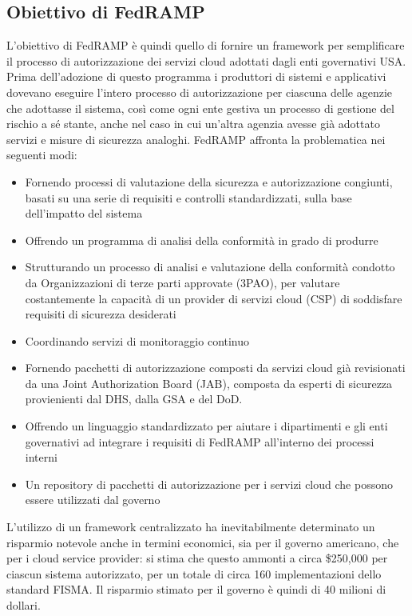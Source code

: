\documentclass[../main.tex]{subfiles}
\begin{document}
\subsection{Obiettivo di FedRAMP}
L'obiettivo di FedRAMP è quindi quello di fornire un framework per semplificare il processo di autorizzazione dei servizi cloud adottati dagli enti governativi USA.
Prima dell'adozione di questo programma i produttori di sistemi e applicativi dovevano eseguire l'intero processo di autorizzazione per ciascuna delle agenzie che adottasse il sistema, così come ogni ente gestiva un processo di gestione del rischio a sé stante, anche nel caso in cui un'altra agenzia avesse già adottato servizi e misure di sicurezza analoghi. 
FedRAMP affronta la problematica nei seguenti modi:
\begin{itemize}
    \item Fornendo processi di valutazione della sicurezza e autorizzazione congiunti, basati su una serie di requisiti e controlli standardizzati, sulla base dell'impatto del sistema 
    \item Offrendo un programma di analisi della conformità in grado di produrre
    \item Strutturando un processo di analisi e valutazione della conformità condotto da Organizzazioni di terze parti approvate (3PAO), per valutare costantemente la capacità di un provider di servizi cloud (CSP) di soddisfare requisiti di sicurezza desiderati
    \item Coordinando servizi di monitoraggio continuo
    \item Fornendo pacchetti di autorizzazione composti da servizi cloud già revisionati da una Joint Authorization Board (JAB), composta da esperti di sicurezza provienienti dal DHS, dalla GSA e del DoD. 
    \item Offrendo un linguaggio standardizzato per aiutare i dipartimenti e gli enti governativi ad integrare i requisiti di FedRAMP all'interno dei processi interni
    \item Un repository di pacchetti di autorizzazione per i servizi cloud che possono essere utilizzati dal governo
\end{itemize}

L'utilizzo di un framework centralizzato ha inevitabilmente determinato un risparmio notevole anche in termini economici, sia per il governo americano, che per i cloud service provider: si stima che questo ammonti a circa \$250,000 per ciascun sistema autorizzato, per un totale di circa 160 implementazioni dello standard FISMA. Il risparmio stimato per il governo è quindi di 40 milioni di dollari.
\end{document}
